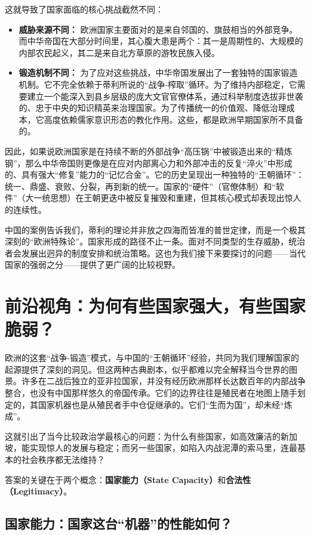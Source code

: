 \documentclass[a5paper, 11pt, openany]{ctexbook}
\begin{document}
这就导致了国家面临的核心挑战截然不同：

\begin{itemize}
    \item \textbf{威胁来源不同：} 欧洲国家主要面对的是来自邻国的、旗鼓相当的外部竞争。而中华帝国在大部分时间里，其心腹大患是两个：其一是周期性的、大规模的内部农民起义，其二是来自北方草原的游牧民族入侵。
    \item \textbf{锻造机制不同：} 为了应对这些挑战，中华帝国发展出了一套独特的国家锻造机制。它不完全依赖于蒂利所说的“战争-榨取”循环。为了维持内部稳定，它需要建立一个能深入到县乡层级的庞大文官官僚体系，通过科举制度选拔非世袭的、忠于中央的知识精英来治理国家。为了传播统一的价值观、降低治理成本，它高度依赖儒家意识形态的教化作用。这些，都是欧洲早期国家所不具备的。
\end{itemize}

因此，如果说欧洲国家是在持续不断的外部战争“高压锅”中被锻造出来的“精炼钢”，那么中华帝国则更像是在应对内部离心力和外部冲击的反复“淬火”中形成的、具有强大“修复”能力的“记忆合金”。它的历史呈现出一种独特的“王朝循环”：统一、鼎盛、衰败、分裂，再到新的统一。国家的“硬件”（官僚体制）和“软件”（大一统思想）在王朝更迭中被反复摧毁和重建，但其核心模式却表现出惊人的连续性。

中国的案例告诉我们，蒂利的理论并非放之四海而皆准的普世定律，而是一个极其深刻的“欧洲特殊论”。国家形成的路径不止一条。面对不同类型的生存威胁，统治者会发展出迥异的制度安排和统治策略。这也为我们接下来要探讨的问题——当代国家的强弱之分——提供了更广阔的比较视野。

\section{前沿视角：为何有些国家强大，有些国家脆弱？}

欧洲的这套“战争-锻造”模式，与中国的“王朝循环”经验，共同为我们理解国家的起源提供了深刻的洞见。但这两种古典剧本，似乎都难以完全解释当今世界的图景。许多在二战后独立的亚非拉国家，并没有经历欧洲那样长达数百年的内部战争整合，也没有中国那样悠久的帝国传承。它们的边界往往是殖民者在地图上随手划定的，其国家机器也是从殖民者手中仓促继承的。它们“生而为国”，却未经“炼成”。

这就引出了当今比较政治学最核心的问题：为什么有些国家，如高效廉洁的新加坡，能实现惊人的发展与稳定；而另一些国家，如陷入内战泥潭的索马里，连最基本的社会秩序都无法维持？

答案的关键在于两个概念：\textbf{国家能力（State Capacity）}和\textbf{合法性（Legitimacy）}。

\subsection{国家能力：国家这台“机器”的性能如何？}
\end{document}
